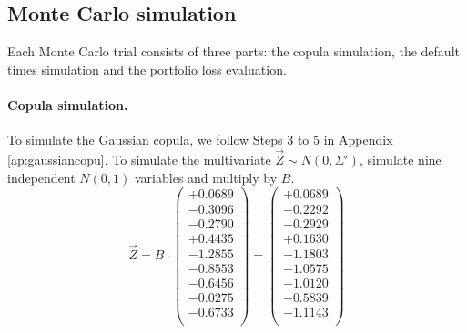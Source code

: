 \documentclass[a4paper,12pt,final]{article}
\begin{document}
\subsection{Monte Carlo simulation}

Each Monte Carlo trial consists of three parts: the copula simulation, the default 
times simulation and the portfolio loss evaluation.

\paragraph{Copula simulation.} To simulate the Gaussian copula, we follow  
Steps $3$ to $5$ in Appendix \ref{ap:gaussiancopu}. To simulate the multivariate
$\vec{Z} \sim N(0,\Sigma')$, simulate nine independent $N(0,1)$ variables and 
multiply by $B$.
{\small
\begin{displaymath}
\vec{Z} = B \cdot
\left(
\begin{array}{c}
  +0.0689 \\
  -0.3096 \\
  -0.2790 \\
  +0.4435 \\
  -1.2855 \\
  -0.8553 \\
  -0.6456 \\
  -0.0275 \\
  -0.6733 \\
\end{array}
\right) 
=
\left(
\begin{array}{c}
  +0.0689 \\
  -0.2292 \\
  -0.2929 \\
  +0.1630 \\
  -1.1803 \\
  -1.0575 \\
  -1.0120 \\
  -0.5839 \\
  -1.1143 \\
\end{array}
\right) 
\end{displaymath}
}
\end{document}
